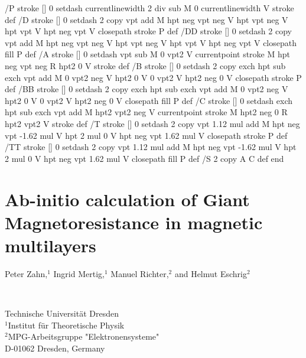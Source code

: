 {{/P { stroke [] 0 setdash
  currentlinewidth 2 div sub M
  0 currentlinewidth V stroke } def
/D { stroke [] 0 setdash 2 copy vpt add M
  hpt neg vpt neg V hpt vpt neg V
  hpt vpt V hpt neg vpt V closepath stroke
  P } def
/DD { stroke [] 0 setdash 2 copy vpt add M
  hpt neg vpt neg V hpt vpt neg V
  hpt vpt V hpt neg vpt V closepath fill
  P } def
/A { stroke [] 0 setdash vpt sub M 0 vpt2 V
  currentpoint stroke M
  hpt neg vpt neg R hpt2 0 V stroke
  } def
/B { stroke [] 0 setdash 2 copy exch hpt sub exch vpt add M
  0 vpt2 neg V hpt2 0 V 0 vpt2 V
  hpt2 neg 0 V closepath stroke
  P } def
/BB { stroke [] 0 setdash 2 copy exch hpt sub exch vpt add M
  0 vpt2 neg V hpt2 0 V 0 vpt2 V
  hpt2 neg 0 V closepath fill
  P } def
/C { stroke [] 0 setdash exch hpt sub exch vpt add M
  hpt2 vpt2 neg V currentpoint stroke M
  hpt2 neg 0 R hpt2 vpt2 V stroke } def
/T { stroke [] 0 setdash 2 copy vpt 1.12 mul add M
  hpt neg vpt -1.62 mul V
  hpt 2 mul 0 V
  hpt neg vpt 1.62 mul V closepath stroke
  P  } def
/TT { stroke [] 0 setdash 2 copy vpt 1.12 mul add M
  hpt neg vpt -1.62 mul V
  hpt 2 mul 0 V
  hpt neg vpt 1.62 mul V closepath fill
  P  } def
/S { 2 copy A C} def
end
}
\section*{Ab-initio calculation of Giant Magnetoresistance in magnetic 
multilayers}
\vspace{2\baselineskip}
%
\hspace*{1.69cm}\begin{minipage}[t]{5.125in}
Peter Zahn,$^1$ Ingrid Mertig,$^1$ Manuel Richter,$^2$ and Helmut Eschrig$^2$
\end{minipage}\\[\baselineskip]
%
\hspace*{1in}\begin{minipage}[t]{5in}
Technische Universit\"at Dresden\\
$^1$Institut f\"ur Theoretische Physik\\
$^2$MPG-Arbeitsgruppe "Elektronensysteme"\\
D-01062 Dresden, Germany
\end{minipage}
\vspace{2\baselineskip}
%
%
}
